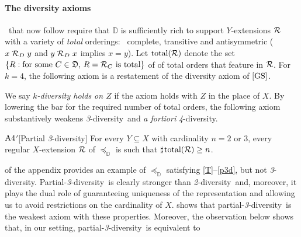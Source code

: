 \documentclass[12pt,a4paper,twoside]{article}
\newcommand{\gsii}{$\textup{[GS]}$}
\newcommand{\reg}{\operatorname{reg}}
\newcommand{\preceqb}{\mathbin{\preceq}}
\newcommand{\countof}{\mathbin{\sharp}\hskip1pt}
\newcommand{\ext}{\mathrel{\mc R}}
\newcommand{\extb}{\mathbin{\mc R}}
\newcommand{\total}{\textup{total}}
\newcommand{\mbbd}{{\mathds D}}
\newcommand{\mbbdpp}{{\mathfrak D}}
\newcommand{\mbbc}{{\mathds C}}
\newcommand{\lb}{\left\{}
\newcommand{\rb}{\right\}}
\newcommand{\parthreediv}{\textup{partial-\textit{3}-diversity}}
\newcommand{\Parthreediv}{\textup{Partial-\textit{3}-diversity}}
\newcommand{\twodiv}{\textit{2}-\textup{diversity}}
\newcommand{\fourdiv}{\textit{4}-\textup{diversity}}
\newcommand{\threediv}{\textit{3}-\textup{diversity}}
\begin{document}




\paragraph{The diversity axioms\hskip-10pt}~that now follow require that $\mbbd$
is sufficiently rich to support $Y$-extensions $\ext$ with a variety of
\emph{total} orderings: \ie\ complete, transitive and antisymmetric
($x \ext_{D} y $ and $y \ext_{D} x$ implies $x = y$). %
Let $ \total ( \ext )$ denote the set $ \lb R : \text{for some
  $ C \in \mbbdpp $, $ R = \extb _{ C }$ is total}\rb$ of of total orders that
feature in $ \ext $. For $ k = 4 $, the following axiom is a restatement of the
diversity axiom of \gsii.
 
We say \emph{$k$-diversity holds on $Z$} if the axiom holds with $Z$ in the
place of $X$. By lowering the bar for the required number of total orders, the
following axiom substantively weakens \threediv\ and \emph{a fortiori} \fourdiv.

\begin{taggedblank}{$\textup{A}4$$'$}[Partial \threediv]\label{p3d}
  For every $ Y\subseteq X $ with cardinality $ n = 2 $ or $  3 $, every regular
  $X$-extension $ \ext $ of $ \preceq _{ \mbbd }$ is such that $ \countof
  \total ( \ext ) \geq n $.

\end{taggedblank}



 of the appendix provides an example of $\preceq_{\mbbd}$
satisfying \ref{T}–\ref{p3d}, but not \threediv. \Parthreediv\ is clearly
stronger than \twodiv\ and, moreover, it plays the dual role of guaranteeing
uniqueness of the representation and allowing us to avoid restrictions on the
cardinality of $ X $.  shows that \parthreediv\ is the
weakest axiom with these properties.  Moreover, the observation below shows
that, in our setting, \parthreediv\ is equivalent to
\end{document}
